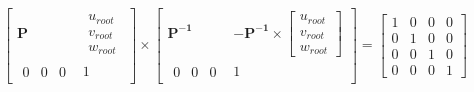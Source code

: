 \documentclass[12pt]{article}
\begin{document}
        \[
            \left[ \begin{array}{cc}
                \textbf{P} & \begin{array}{c} u_{root} \\ v_{root} \\ w_{root} \end{array} \\
                \begin{array}{ccc} 0 & 0 & 0 \end{array} & 1
            \end{array} \right]
            \times
            \left[ \begin{array}{cc}
                \bm{P^{-1}} &
                -\bm{P^{-1}} \times
                \left[ \begin{array}{c}
                    u_{root} \\ v_{root} \\ w_{root}
                \end{array} \right] \\
                \begin{array}{ccc} 0 & 0 & 0 \end{array} &
                1
            \end{array} \right]
            =
            \left[ \begin{array}{cccc}
                1 & 0 & 0 & 0 \\
                0 & 1 & 0 & 0 \\
                0 & 0 & 1 & 0 \\
                0 & 0 & 0 & 1
            \end{array} \right]
        \]
\end{document}
